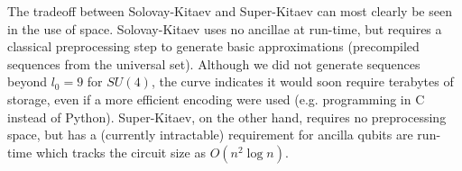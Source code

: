 The tradeoff between Solovay-Kitaev and Super-Kitaev can most clearly
be seen in the use of space. Solovay-Kitaev uses no ancillae at run-time,
but requires a classical preprocessing step to generate basic
approximations (precompiled sequences from the universal set). Although
we did not generate sequences beyond $l_0 = 9$ for $SU(4)$, the curve
indicates it would soon require terabytes of storage, even if a more
efficient encoding were used (e.g. programming in C instead of Python).
Super-Kitaev, on the other hand, requires no preprocessing space, but
has a (currently intractable) requirement for ancilla qubits are run-time
which tracks the circuit size as $O(n^2 \log n)$.


